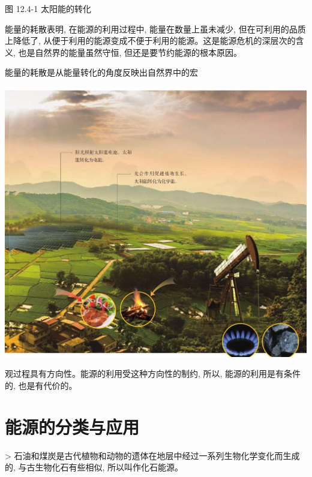 \documentclass[10pt]{article}
\begin{document}
\begin{mdframed}

图 12.4-1 太阳能的转化

\end{mdframed}

能量的耗散表明, 在能源的利用过程中, 能量在数量上虽未减少, 但在可利用的品质上降低了, 从便于利用的能源变成不便于利用的能源。这是能源危机的深层次的含义, 也是自然界的能量虽然守恒, 但还是要节约能源的根本原因。

能量的耗散是从能量转化的角度反映出自然界中的宏

\begin{center}
\includegraphics[max width=1.0\textwidth]{images/01911d5f-8e38-70c0-b5b8-2b399bd115b6_100_177081.jpg}
\end{center}

观过程具有方向性。能源的利用受这种方向性的制约, 所以, 能源的利用是有条件的, 也是有代价的。

\section*{能源的分类与应用}

\begin{mdframed}

> 石油和煤炭是古代植物和动物的遗体在地层中经过一系列生物化学变化而生成的, 与古生物化石有些相似, 所以叫作化石能源。

\end{mdframed}
\end{document}
